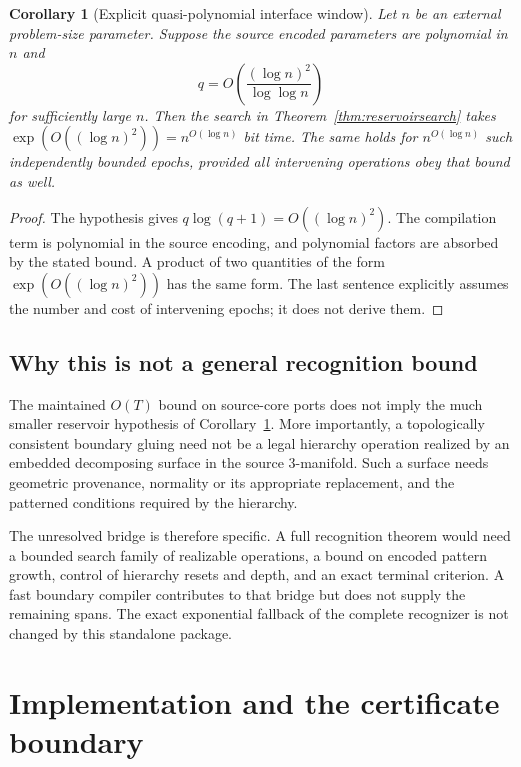 \documentclass[11pt]{article}
\newtheorem{corollary}[theorem]{Corollary}
\theoremstyle{definition}\newtheorem{definition}[theorem]{Definition}\newtheorem{example}[theorem]{Example}
\theoremstyle{remark}\newtheorem{remark}[theorem]{Remark}
\begin{document}
\begin{corollary}[Explicit quasi-polynomial interface window]
\label{cor:qpoly}
Let $n$ be an external problem-size parameter. Suppose the source encoded parameters are polynomial in $n$ and
\[
                     q=O\!\left(\frac{(\log n)^2}{\log\log n}\right)
\]
for sufficiently large $n$. Then the search in Theorem~\ref{thm:reservoirsearch} takes $\exp(O((\log n)^2))=n^{O(\log n)}$ bit time. The same holds for $n^{O(\log n)}$ such independently bounded epochs, provided all intervening operations obey that bound as well.
\end{corollary}
\begin{proof}
The hypothesis gives $q\log(q+1)=O((\log n)^2)$. The compilation term is polynomial in the source encoding, and polynomial factors are absorbed by the stated bound. A product of two quantities of the form $\exp(O((\log n)^2))$ has the same form. The last sentence explicitly assumes the number and cost of intervening epochs; it does not derive them.
\end{proof}

\subsection{Why this is not a general recognition bound}
The maintained $O(T)$ bound on source-core ports does not imply the much smaller reservoir hypothesis of Corollary~\ref{cor:qpoly}. More importantly, a topologically consistent boundary gluing need not be a legal hierarchy operation realized by an embedded decomposing surface in the source 3-manifold. Such a surface needs geometric provenance, normality or its appropriate replacement, and the patterned conditions required by the hierarchy.

The unresolved bridge is therefore specific. A full recognition theorem would need a bounded search family of realizable operations, a bound on encoded pattern growth, control of hierarchy resets and depth, and an exact terminal criterion. A fast boundary compiler contributes to that bridge but does not supply the remaining spans. The exact exponential fallback of the complete recognizer is not changed by this standalone package.

\section{Implementation and the certificate boundary}
\label{sec:implementation}
\end{document}
